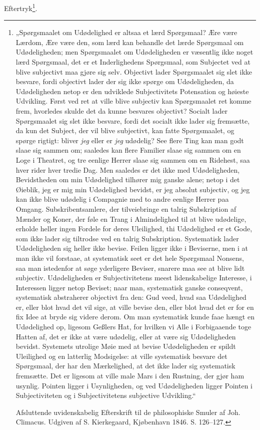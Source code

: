 \documentclass[11pt]{book}
\begin{document}
Eftertryk\footnote{„Spørgsmaalet om Udødelighed er altsaa et lærd
Spørgsmaal? Ære være Lærdom, Ære være den, som lærd kan behandle det
lærde Spørgsmaal om Udødeligheden; men Spørgsmaalet om
Udødeligheden er væsentlig ikke noget lærd Spørgsmaal, det er et
Inderlighedens Spørgsmaal, som Subjectet ved at blive subjectivt maa
gjøre sig selv. Objectivt lader Spørgsmaalet sig slet ikke besvare,
fordi objectivt lader der sig ikke spørge om Udødeligheden, da
Udødeligheden netop er den udviklede Subjectivitets Potensation og
høieste Udvikling. Først ved ret at ville blive subjectiv kan
Spørgsmaalet ret komme frem, hvorledes skulde det da kunne besvares
objectivt? Socialt lader Spørgsmaalet sig slet ikke besvare, fordi
det socialt ikke lader sig fremsætte, da kun det Subject, der vil
blive subjectivt, kan fatte Spørgsmaalet, og spørge rigtigt: bliver
\emph{jeg} eller er \emph{jeg} udødelig? See flere Ting kan man godt
slaae sig sammen om; saaledes kan flere Familier slaae sig sammen om
en Loge i Theatret, og tre eenlige Herrer slaae sig sammen om en
Ridehest, saa hver rider hver tredie Dag. Men saaledes er det ikke
med Udødeligheden, Bevidstheden om min Udødelighed tilhører mig
ganske alene; netop i det Øieblik, jeg er mig min Udødelighed
bevidst, er jeg absolut subjectiv, og jeg kan ikke blive udødelig i
Compagnie med to andre eenlige Herrer paa Omgang. Subskribentsamlere,
der tilveiebringe en talrig Subskription af Mænder og Koner, der føle
en Trang i Almindelighed til at blive udødelige, erholde heller ingen
Fordele for deres Uleilighed, thi Udødelighed er et Gode, som ikke
lader sig tiltrodse ved en talrig Subskription. Systematisk lader
Udødeligheden sig heller ikke bevise. Feilen ligger ikke i
Beviserne, men i at man ikke vil forstaae, at systematisk seet er
det hele Spørgsmaal Nonsens, saa man istedenfor at søge yderligere
Beviser, snarere maa see at blive lidt subjectiv.
Udødeligheden er Subjectivitetens meest lidenskabelige Interesse, i
Interessen ligger netop Beviset; naar man, systematisk ganske
conseqvent, systematisk abstraherer objectivt fra den: Gud veed,
hvad saa Udødelighed er, eller blot hvad det vil sige, at ville
bevise den, eller blot hvad det er for en fix Idee at bryde sig
videre derom. Om man systematisk kunde faae hængt en Udødelighed op,
ligesom Geßlers Hat, for hvilken vi Alle i Forbigaaende toge Hatten
af, det er ikke at være udødelig, eller at være sig Udødeligheden
bevidst. Systemets utrolige Møie med at bevise Udødeligheden er
spildt Uleilighed og en latterlig Modsigelse: at ville systematisk
besvare det Spørgsmaal, der har den Mærkelighed, at det ikke lader
sig systematisk fremsætte. Det er ligesom at ville male Mars i den
Rustning, der gjør ham usynlig. Pointen ligger i Usynligheden, og
ved Udødeligheden ligger Pointen i Subjectiviteten og i
Subjectivitetens subjective Udvikling.“

Afsluttende uvidenskabelig Efterskrift til de philosophiske Smuler
af Joh. Climacus. Udgiven af S. Kierkegaard, Kjøbenhavn 1846. S.
126--127.}.
\end{document}
